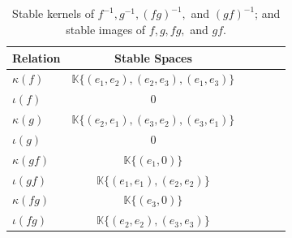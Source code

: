 \documentclass[11pt,oneside]{amsbook}
\numberwithin{equation}{section}
\theoremstyle{plain}
\theoremstyle{definition}
\theoremstyle{remark}
\newcommand{\KK}{\mathbb{K}}
\begin{document}
	\\
	\
	\\
	\
	\\
	\
	\\
	\quad \quad {}
	\begin{table} %
		\centering %
		\begin{tabular}{l c c c c c} %
			\midrule %
			Relation & Stable Spaces  \\ %
			\midrule %
			$\kappa(f)$ & $\KK \{(e_1, e_2), (e_2, e_3), (e_1, e_3)\}$  \\ %
			$\iota(f)$ & $0$ \\
			$\kappa(g)$ & $\KK \{(e_2, e_1), (e_3, e_2), (e_3, e_1)\}$ \\
			$\iota(g)$ &  $0$ \\
			$\kappa(gf)$ & $\KK \{(e_1, 0)\}$ \\
			$\iota(gf)$ & $\KK \{(e_1, e_1), (e_2, e_2)\}$ \\
			$\kappa(fg)$ & $\KK \{(e_3, 0)\}$ \\
			$\iota(fg)$ & $\KK \{(e_2, e_2), (e_3, e_3)\}$ \\
			\midrule %
			\bottomrule %
		\end{tabular}
		\caption{Stable kernels of $f^{-1}, g^{-1}, (fg)^{-1},$ and $(gf)^{-1}$; and stable images of $f, g, fg,$ and $gf$.} %
		\label{tab:template} %
	\end{table}
	
\end{document}
